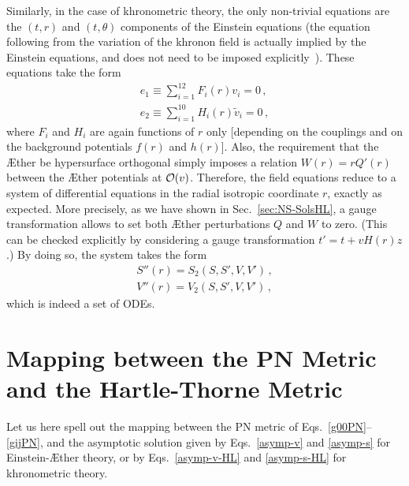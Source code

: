 \documentclass[prd,aps,twocolumn,nofootinbib,showpacs,superscriptaddress]{revtex4-1}
\begin{document}
Similarly, in the case of khronometric theory, the only non-trivial
equations are the  $(t,r)$ and $(t,\theta)$ components of the Einstein
equations (the equation following from the variation of the khronon
field is actually implied by the Einstein equations, and does not need
to be imposed explicitly~\cite{Jacobson:2010mx}). These equations take
the form
\begin{gather}
e_1\equiv\label{etq}\sum_{i=1}^{12}F_i(r)
v_i=0\,,\\ e_2\equiv\label{erq}\sum_{i=1}^{10}H_i(r) \tilde{v}_i=0\,,
\end{gather}
where $F_i$ and $H_i$ are again functions of $r$ only [depending on
  the couplings and on the background potentials $f(r)$ and
  $h(r)$]. Also, the requirement that the \AE ther be hypersurface
orthogonal simply imposes a relation   $W(r)=rQ'(r)$ between the
\AE ther potentials at ${\cal O}(v)$. Therefore, the field equations
reduce to a system of differential equations  in the radial isotropic
coordinate $r$, exactly as expected.  More precisely, as we have shown
in Sec.~\ref{sec:NS-SolsHL}, a gauge transformation allows to set both
\AE ther perturbations $Q$ and $W$ to zero. (This can be checked explicitly
by considering a gauge transformation $t'=t+v H(r) z$.) By doing so,
the system takes the form
\begin{gather}
S''(r)=S_2(S,S',V,V')\,,\\ V''(r)=V_2(S,S',V,V')\,,
\end{gather}
which is indeed a set of ODEs.


\section{Mapping between the PN Metric and the Hartle-Thorne Metric}
\label{app:mapping}

Let us here spell out the mapping between the PN metric of Eqs.~\eqref{g00PN}--\eqref{gijPN},
and the asymptotic solution given by Eqs.~\eqref{asymp-v} and \eqref{asymp-s}
for Einstein-\AE ther theory, or by Eqs.~\eqref{asymp-v-HL} and \eqref{asymp-s-HL} for khronometric theory.
\end{document}
